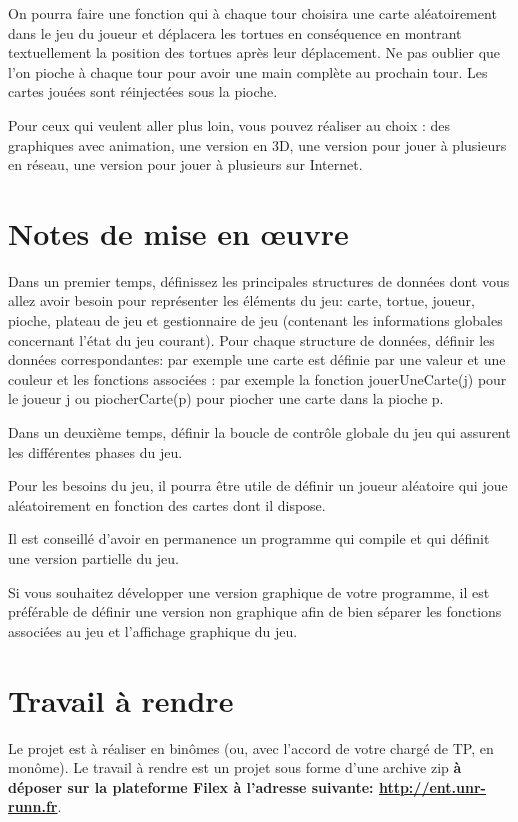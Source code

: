 \documentclass[10pt]{article}
\begin{document}
On pourra faire une fonction qui à chaque tour choisira une carte
aléatoirement dans le jeu du joueur et déplacera les tortues en
conséquence en montrant textuellement la position des tortues après
leur déplacement. Ne pas oublier que l'on pioche à chaque tour pour
avoir une main complète au prochain tour. Les cartes jouées sont
réinjectées sous la pioche.

Pour ceux qui veulent aller plus loin, vous pouvez réaliser au choix
: des graphiques avec animation, une version en 3D, une version pour
jouer à plusieurs en réseau, une version pour jouer à plusieurs sur Internet.

\section{Notes de mise en {\oe}uvre}

Dans un premier temps, définissez les principales structures de données dont vous allez avoir besoin pour représenter les éléments du jeu: carte, tortue, joueur, pioche, plateau de jeu et gestionnaire de jeu (contenant les informations globales concernant l'état du jeu courant). Pour chaque structure de données, définir les données correspondantes: par exemple une carte est définie par une valeur et une couleur et les fonctions associées : par exemple la fonction jouerUneCarte(j) pour le joueur j ou piocherCarte(p) pour piocher une carte dans la pioche p.

Dans un deuxième temps, définir la boucle de contrôle globale du jeu qui assurent les différentes phases du jeu.

Pour les besoins du jeu, il pourra être utile de définir un joueur aléatoire qui joue aléatoirement en fonction des cartes dont il dispose.

Il est conseillé d'avoir en permanence un programme qui compile et qui définit une version partielle du jeu.

Si vous souhaitez développer une version graphique de votre programme, il est préférable de définir une version non graphique afin de bien séparer les fonctions associées au jeu et l'affichage graphique du jeu.

\section{Travail à rendre}
Le projet est à réaliser en binômes (ou, avec l'accord de votre 
chargé de TP, en monôme). Le travail à rendre est un projet sous forme 
d'une archive zip {\bf à déposer sur la plateforme Filex à l'adresse suivante: \url{http://ent.unr-runn.fr}}. 
\end{document}
